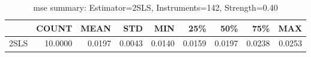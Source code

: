 \begin{table}[ht]
\centering
\caption{mse summary: Estimator=2SLS, Instruments=142, Strength=0.40}
\begin{tabular}{lrrrrrrrr}
\toprule
 & COUNT & MEAN & STD & MIN & 25\% & 50\% & 75\% & MAX \\
\midrule
2SLS & 10.0000 & 0.0197 & 0.0043 & 0.0140 & 0.0159 & 0.0197 & 0.0238 & 0.0253 \\
\bottomrule
\end{tabular}
\end{table}
